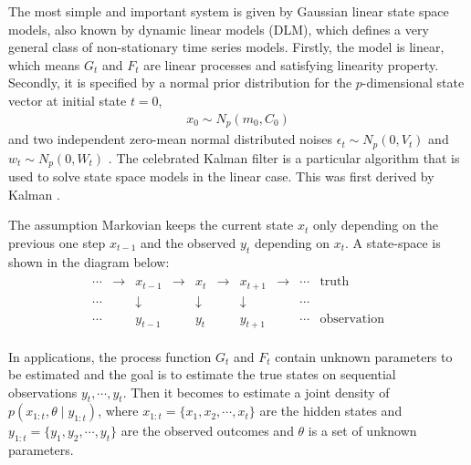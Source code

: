 The most simple and important system is given by Gaussian linear state space models, also known by dynamic linear models (DLM), which defines a very general class of non-stationary time series models.  Firstly, the model is linear, which means $G_t$ and $F_t$ are linear processes and satisfying linearity property. Secondly, it is specified by a normal prior distribution for the $p$-dimensional state vector at initial state $t=0$, 
\begin{align*}
x_0 \sim N_p(m_0,C_0)
\end{align*} 
and two independent zero-mean normal distributed noises $\epsilon_t \sim N_p(0,V_t)$ and $w_t \sim N_p(0,W_t)$ \cite{petris2009dynamic}. The celebrated Kalman filter is a particular algorithm that is used to solve state space models in the linear case. This was first derived by Kalman \cite{kalman1960new}.

The assumption Markovian keeps the current state $x_t$ only depending on the previous one step $x_{t-1}$ and the observed $y_t$ depending on $x_t$. A state-space is shown in the diagram below:
\begin{align*}
\begin{array}{cccccccccc}\cdots &\to &x_{t-1}&\to &x_{t}&\to &x_{t+1}&\to &\cdots &{\text{truth}}\\ \cdots &&\downarrow &&\downarrow &&\downarrow &&\cdots &\\ \cdots&&y_{t-1}&&y_{t}&&y_{t+1}&&\cdots &{\text{observation}}\end{array}
\end{align*}

In applications, the process function $G_t$ and $F_t$ contain unknown parameters to be estimated \cite{de1988likelihood} and the goal is to estimate the true states on sequential observations $y_t, \cdots, y_t$. Then it becomes to estimate a joint density of $p(x_{1:t},\theta \mid y_{1:t})$, where $x_{1:t} = \{x_1, x_2, \cdots, x_t \}$ are the hidden states and $y_{1:t} = \{y_1, y_2, \cdots, y_t \}$ are the observed outcomes and $\theta$ is a set of unknown parameters. 


